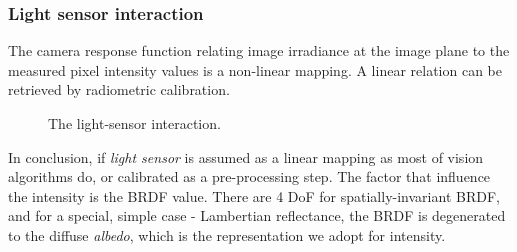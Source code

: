 \subsubsection{Light sensor interaction}
The camera response function relating image irradiance at the image plane to the measured pixel intensity values is a non-linear mapping. A linear relation can be retrieved by radiometric calibration.
\begin{figure}[!ht]
\centering
{}
\caption{The light-sensor interaction.}
\label{fig:light_sensor_interact}
\end{figure}

In conclusion, if \textit{light sensor} is assumed as a linear mapping as most of vision algorithms do, or calibrated as a pre-processing step. The factor that influence the intensity is the BRDF value. There are 4 DoF for spatially-invariant BRDF, and for a special, simple case - Lambertian reflectance, the BRDF is degenerated to the diffuse \textit{albedo}, which is the representation we adopt for intensity.


